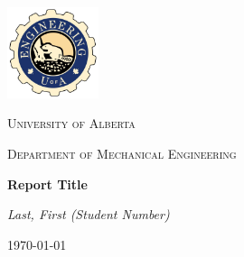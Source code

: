 \documentclass[12pt, letterpaper]{article}
\begin{document}
	\begin{titlepage}
		\centering
		\includegraphics[width=0.2\textwidth]{Logo.jpg}\par\vspace{1cm}
		{\scshape\LARGE University of Alberta \par}
		\vspace{1cm}
		{\scshape\Large Department of Mechanical Engineering\par}
		\vspace{1.5cm}
		{\huge\bfseries Report Title\par}
		\vspace{2cm}
		{\Large\itshape Last, First (Student Number)\par}
		\vfill
		\par %
		

		
		\vfill
	
			{\large \today\par} %
	\end{titlepage}
	
\end{document}
